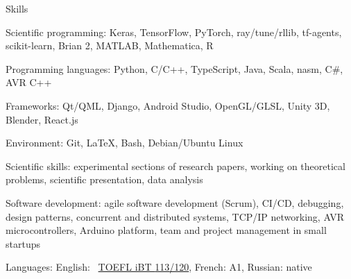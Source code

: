 \documentclass{resume} %
\newcommand*{\img}[1]{%
	\raisebox{-.02\baselineskip}{%
		\texttt{[image: \#1]}%
	}%
}
\newcommand*{\emoji}[1]{\img{./emoji/\imgpref#1.png}}
\newcommand*{\mybold}[1]{{\color{pinkunderline} #1}}
\newcommand*{\myboldq}[1]{{#1}}
\def\imgpref{bleak-}
\newcommand{\mylink}{{\color{gray}\faExternalLink}}
\begin{document}
\vspace{-2em}
\begin{rSection}{Skills}
	\vspace{-1em}
	\item \myboldq{Scientific programming:} \mybold{Keras, TensorFlow, PyTorch,} ray/tune/rllib, tf-agents, scikit-learn, Brian 2, MATLAB, Mathematica, R
	\item \myboldq{Programming languages:} \mybold{Python, C/C++}, TypeScript, Java, {\small Scala, nasm, C\#, AVR C++}
	\item \myboldq{Frameworks:} Qt/QML, Django, {\small Android Studio, OpenGL/GLSL, Unity 3D, Blender, React.js}
	\item \myboldq{Environment:} \mybold{Git, \LaTeX, Bash, Debian/Ubuntu Linux}
	\item \myboldq{Scientific skills:} \mybold{experimental} sections of research papers, working on \mybold{theoretical} problems, scientific presentation, data analysis
	\item \myboldq{Software development:} \mybold{agile} software development (Scrum), CI/CD, debugging, design patterns, concurrent and distributed systems, {\small TCP/IP networking, AVR microcontrollers, Arduino platform, team and project management in \mybold{small startups}}
	\item \myboldq{Languages:} \emoji{flag-us} English: \mylink~\href{https://sergia-ch.github.io/epfl/TOEFL.pdf}{TOEFL iBT \mybold{113}/120}, {\small \emoji{flag-fr} French: A1, \emoji{flag-ru} Russian: native}
\end{rSection}
\end{document}
